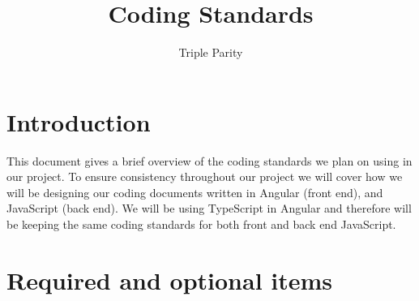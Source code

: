 \documentclass[a4paper]{article}
\title{Coding Standards}
\author{Triple Parity}
\date{}
\begin{document}
\maketitle

\graphicspath{{images/coding-standards/}}

\section{Introduction}

This document gives a brief overview of the coding standards we plan on using in our project. 
To ensure consistency throughout our project we will cover how we will be designing our coding 
documents written in Angular (front end), and JavaScript (back end). We will be using TypeScript 
in Angular and therefore will be keeping the same coding standards for both front and back end 
JavaScript.

\section{Required and optional items}
\end{document}
